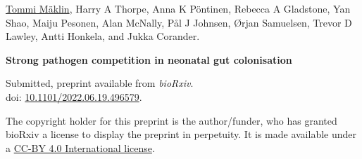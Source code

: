 \vspace{80pt}
\underline{Tommi Mäklin}, Harry A Thorpe, Anna K Pöntinen, Rebecca
A Gladstone, Yan Shao, Maiju Pesonen, Alan McNally, Pål J Johnsen,
Ørjan Samuelsen, Trevor D Lawley, Antti Honkela, and Jukka
Corander.

\vspace{10pt}
\noindent\textbf{Strong pathogen competition in neonatal gut colonisation}

\vspace{10pt}
\noindent Submitted, preprint available from \textit{bioRxiv}.
\\doi: \href{https://doi.org/10.1101/2022.06.19.496579}{10.1101/2022.06.19.496579}.

\vspace{60pt}
\noindent
The copyright holder for this preprint is the author/funder, who has
granted bioRxiv a license to display the preprint in perpetuity. It is
made available under a \href{http://creativecommons.org/licenses/by/4.0/}{CC-BY 4.0 International license}.

\newpage
\thispagestyle{empty}
\mbox{}
\newpage\cleardoublepage\cleardoublepage













